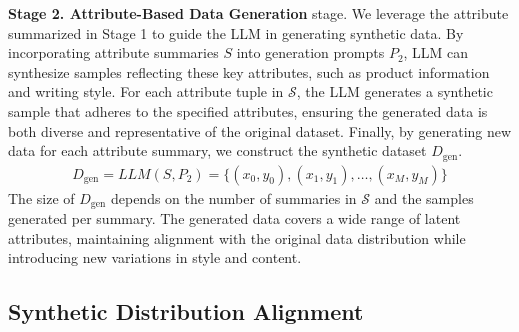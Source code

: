 \textbf{Stage 2. Attribute-Based Data Generation} stage. We leverage the attribute summarized in Stage 1 to guide the LLM in generating synthetic data. By incorporating attribute summaries $S$ into generation prompts $P_2$, LLM can synthesize samples reflecting these key attributes, such as product information and writing style. For each attribute tuple in $\mathcal{S}$, the LLM generates a synthetic sample that adheres to the specified attributes, ensuring the generated data is both diverse and representative of the original dataset. Finally, by generating new data for each attribute summary, we construct the synthetic dataset $D_{\text{gen}}$.
\begin{align}
D_{\text{gen}} = LLM(S,P_2) =\{(x_0, y_0), (x_1, y_1), \dots, (x_M, y_M)\}
\end{align}
 The size of $D_{\text{gen}}$ depends on the number of summaries in $\mathcal{S}$ and the samples generated per summary. The generated data covers a wide range of latent attributes, maintaining alignment with the original data distribution while introducing new variations in style and content.

\subsection{Synthetic Distribution Alignment}







